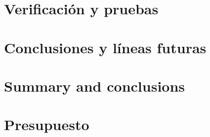 \documentclass[spanish,a4paper,14pt,oneside]{extreport}
\begin{document}
  \newpage{\pagestyle{empty}}
  \thispagestyle{empty}
   
  \chapter{Verificación y pruebas}
  \label{chapter:cinco}
   
  
   
  \newpage{\pagestyle{empty}}
  \thispagestyle{empty}
   
  \chapter{Conclusiones y líneas futuras}
  \label{chapter:conclusiones}
   
  
   
  \newpage{\pagestyle{empty}}
  \thispagestyle{empty}
   
  \chapter{Summary and conclusions}
  \label{chapter:ingles}
   
  
   
  \newpage{\pagestyle{empty}}
  \thispagestyle{empty}
   
  \chapter{Presupuesto}
  \label{chapter:Presupuesto}
   
  

   
   
   
   
  
   
  
   
   
  
\end{document}
